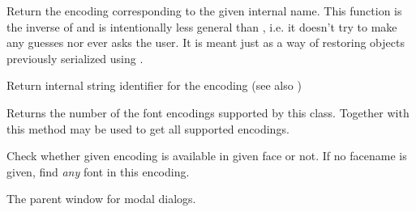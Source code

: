 \label{wxfontmappergetencodingfromname}


Return the encoding corresponding to the given internal name. This function is
the inverse of  and is
intentionally less general than 
, i.e. it doesn't
try to make any guesses nor ever asks the user. It is meant just as a way of
restoring objects previously serialized using 
.


\label{wxfontmappergetencodingname}


Return internal string identifier for the encoding (see also 
)




\label{wxfontmappergetsupportedencodingscount}


Returns the number of the font encodings supported by this class. Together with 
 this method may be used to get
all supported encodings.


\label{wxfontmapperisencodingavailable}


Check whether given encoding is available in given face or not.
If no facename is given, find {\it any} font in this encoding.


\label{wxfontmappersetdialogparent}


The parent window for modal dialogs.


\label{wxfontmappersetdialogtitle}

